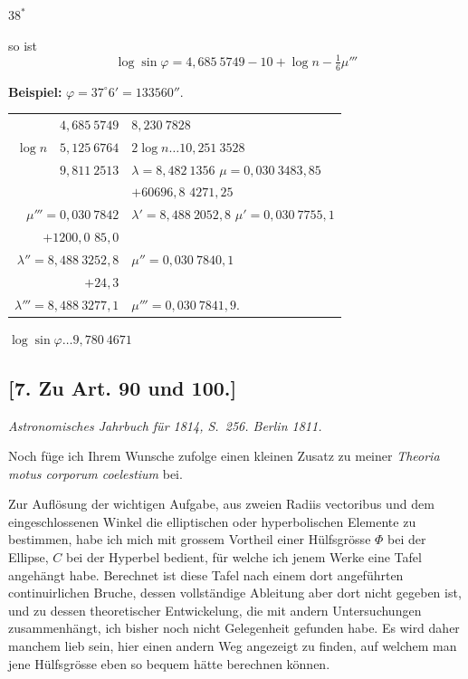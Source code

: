 \documentclass[12pt,a4paper]{article}
\begin{document}
\begin{center}
$38^*$
\end{center}

so ist
\[
\log\sin\varphi = 4{,}685\ 5749 - 10 + \log n - \tfrac{1}{6}\mu'''
\]

\textbf{Beispiel:} $\varphi = 37^\circ 6' = 133560''$.

\begin{center}
\begin{tabular}{r|l}
$4{,}685\ 5749$ & $8{,}230\ 7828$ \\
$\log n \quad 5{,}125\ 6764$ & $2\log n \ldots 10{,}251\ 3528$ \\
\hline
$9{,}811\ 2513$ & $\lambda = 8{,}482\ 1356$ \quad $\mu = 0{,}030\ 3483{,}85$ \\
& $+ 60696{,}8$ \quad $4271{,}25$ \\
$\mu''' = 0{,}030\ 7842$ & $\lambda' = 8{,}488\ 2052{,}8$ \quad $\mu' = 0{,}030\ 7755{,}1$ \\
$+ 1200{,}0$ \quad $85{,}0$ & \\
$\lambda'' = 8{,}488\ 3252{,}8$ & $\mu'' = 0{,}030\ 7840{,}1$ \\
$+ 24{,}3$ & \\
$\lambda''' = 8{,}488\ 3277{,}1$ & $\mu''' = 0{,}030\ 7841{,}9$.
\end{tabular}
\end{center}

\begin{center}
$\log\sin\varphi \ldots 9{,}780\ 4671$
\end{center}

\subsection*{[7. Zu Art. 90 und 100.]}

\textit{Astronomisches Jahrbuch f\"ur 1814, S.~256. Berlin 1811.}

Noch f\"uge ich Ihrem Wunsche zufolge einen kleinen Zusatz zu
meiner \textit{Theoria motus corporum coelestium} bei.

Zur Aufl\"osung der wichtigen Aufgabe, aus zweien Radiis vectoribus und
dem eingeschlossenen Winkel die elliptischen oder hyperbolischen Elemente
zu bestimmen, habe ich mich mit grossem Vortheil einer H\"ulfsgr\"osse $\Phi$ bei
der Ellipse, $C$ bei der Hyperbel bedient, f\"ur welche ich jenem Werke eine
Tafel angeh\"angt habe. Berechnet ist diese Tafel nach einem dort angef\"uhrten
continuirlichen Bruche, dessen vollst\"andige Ableitung aber dort nicht gegeben
ist, und zu dessen theoretischer Entwickelung, die mit andern Untersuchungen
zusammenh\"angt, ich bisher noch nicht Gelegenheit gefunden habe. Es wird
daher manchem lieb sein, hier einen andern Weg angezeigt zu finden, auf
welchem man jene H\"ulfsgr\"osse eben so bequem h\"atte berechnen k\"onnen.
\end{document}
